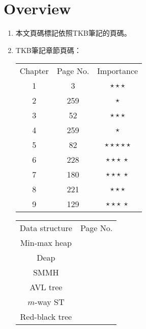 \section{Overview}

\begin{enumerate}
    \item 本文頁碼標記依照TKB筆記\cite{2}的頁碼。
    \item TKB筆記\cite{2}章節頁碼：
    \begin{table}[H]
        \centering
        \begin{tabular}{|c|c|c|}
            \hline
            Chapter & Page No. & Importance \\
            \Xhline{2\arrayrulewidth}
            1 & 3 & $\star\star\star$ \\
            \hline
            2 & 259 & $\star$ \\
            \hline
            3 & 52 & $\star\star\star$ \\
            \hline
            4 & 259 & $\star$ \\
            \hline
            5 & 82 & $\star\star\star\star\star$ \\
            \hline
            6 & 228 & $\star\star\star \ \star$ \\
            \hline
            7 & 180 & $\star\star\star \ \star$ \\
            \hline
            8 & 221 & $\star\star\star$ \\
            \hline
            9 & 129 & $\star\star\star \ \star$ \\
            \hline
        \end{tabular}
    \end{table}
    \begin{table}[H]
        \centering
        \begin{tabular}{|c|c|}
            \hline
            Data structure & Page No. \\
            \Xhline{2\arrayrulewidth}
            Min-max heap & \pageref{min-maxheap} \\
            \hline
            Deap & \pageref{deap} \\
            \hline
            SMMH & \pageref{smmh} \\
            \hline
            AVL tree & \pageref{avltree} \\
            \hline
            $m$-way ST & \pageref{m-wayst} \\
            \hline
            Red-black tree & \pageref{rbt} \\

\end{tabular}
\end{table}
\end{enumerate}
